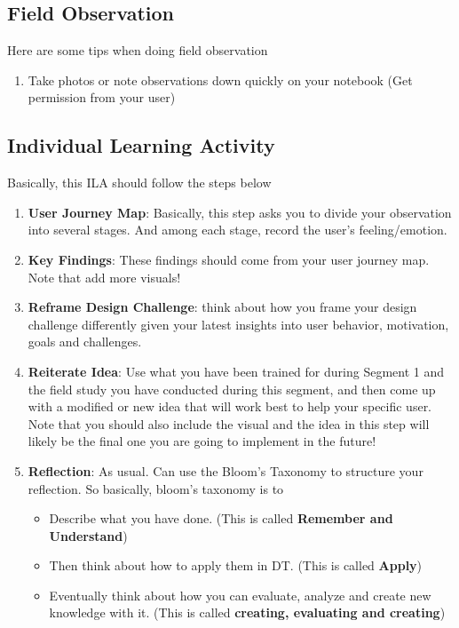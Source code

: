 \documentclass[math,code]{amznotes}
\theoremstyle{remark}
\begin{document}
\subsection{Field Observation}
Here are some tips when doing field observation
\begin{enumerate}
    \item Take photos or note observations down quickly on your notebook (Get permission from your user)
\end{enumerate}

\subsection{Individual Learning Activity}
Basically, this ILA should follow the steps below
\begin{enumerate}
    \item \textbf{User Journey Map}: Basically, this step asks you to divide your observation into several stages. And among each stage, record the user's feeling/emotion.
    \item \textbf{Key Findings}: These findings should come from your user journey map. Note that add more visuals!
    \item \textbf{Reframe Design Challenge}: think about how you frame your design challenge differently given your latest insights into user behavior, motivation, goals and challenges.
    \item \textbf{Reiterate Idea}: Use what you have been trained for during Segment 1 and the field study you have conducted during this segment, and then come up with a modified or new idea that will work best to help your specific user. Note that you should also include the visual and the idea in this step will likely be the final one you are going to implement in the future!
    \item \textbf{Reflection}: As usual. Can use the Bloom's Taxonomy to structure your reflection. So basically, bloom's taxonomy is to
    \begin{itemize}
        \item Describe what you have done. (This is called \textbf{Remember and Understand})
        \item Then think about how to apply them in DT. (This is called \textbf{Apply})
        \item Eventually think about how you can evaluate, analyze and create new knowledge with it. (This is called \textbf{creating, evaluating and creating})
    \end{itemize}
\end{enumerate}
\end{document}
